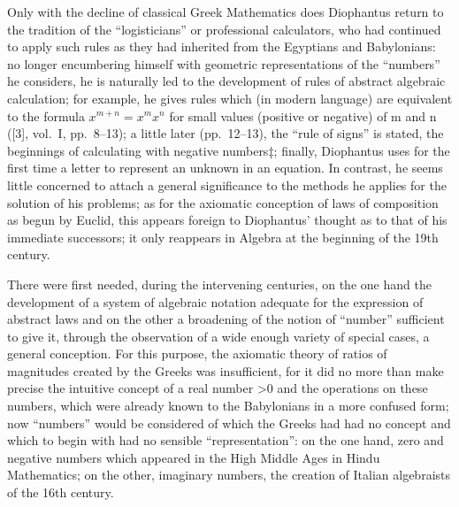 Only with the decline of classical Greek Mathematics does Diophantus return to the tradition of the ``logisticians'' or professional calculators, who had continued to apply such rules as they had inherited from the Egyptians and Babylonians: no longer encumbering himself with geometric representations of the ``numbers'' he considers, he is naturally led to the development of rules of abstract algebraic calculation; for example, he gives rules which (in modern language) are equivalent to the formula \(x^{m+n} = x^{m}x^{n}\) for small values (positive or negative) of m and n ({[}3{]}, vol.~I, pp.~8--13); a little later (pp.~12--13), the ``rule of signs'' is stated, the beginnings of calculating with negative numbers‡; finally, Diophantus uses for the first time a letter to represent an unknown in an equation. In contrast, he seems little concerned to attach a general significance to the methods he applies for the solution of his problems; as for the axiomatic conception of laws of composition as begun by Euclid, this appears foreign to Diophantus' thought as to that of his immediate successors; it only reappears in Algebra at the beginning of the 19th century.

There were first needed, during the intervening centuries, on the one hand the development of a system of algebraic notation adequate for the expression of abstract laws and on the other a broadening of the notion of ``number'' sufficient to give it, through the observation of a wide enough variety of special cases, a general conception. For this purpose, the axiomatic theory of ratios of magnitudes created by the Greeks was insufficient, for it did no more than make precise the intuitive concept of a real number \textgreater0 and the operations on these numbers, which were already known to the Babylonians in a more confused form; now ``numbers'' would be considered of which the Greeks had had no concept and which to begin with had no sensible ``representation'': on the one hand, zero and negative numbers which appeared in the High Middle Ages in Hindu Mathematics; on the other, imaginary numbers, the creation of Italian algebraists of the 16th century.

